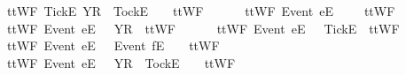 \begin{isabellebody}
\ \ {\isachardoublequoteopen}ttWF{}\ {\isacharbrackleft}{\isacharbrackleft}Tick{\isacharbrackright}\isactrlsub E{\isacharbrackright}\ {\isacharparenleft}{\isacharbrackleft}Y{\isacharbrackright}\isactrlsub R\ {\isacharhash}\ {\isacharbrackleft}Tock{\isacharbrackright}\isactrlsub E\ {\isacharhash}\ {\isasymsigma}{\isacharparenright}\ {\isacharequal}\ ttWF{}\ {\isacharbrackleft}{\isacharbrackright}\ {\isasymsigma}{\isachardoublequoteclose}\ {\isacharbar}\ \isanewline
\ \ {\isachardoublequoteopen}ttWF{}\ {\isacharparenleft}{\isacharbrackleft}Event\ e{\isacharbrackright}\isactrlsub E\ {\isacharhash}\ {\isasymsigma}{\isacharparenright}\ {\isacharbrackleft}{\isacharbrackright}\ {\isacharequal}\ ttWF{}\ {\isasymsigma}\ {\isacharbrackleft}{\isacharbrackright}{\isachardoublequoteclose}\ {\isacharbar}\ \isanewline
\ \ {\isachardoublequoteopen}ttWF{}\ {\isacharparenleft}{\isacharbrackleft}Event\ e{\isacharbrackright}\isactrlsub E\ {\isacharhash}\ {\isasymsigma}{\isacharparenright}\ {\isacharbrackleft}{\isacharbrackleft}Y{\isacharbrackright}\isactrlsub R{\isacharbrackright}\ {\isacharequal}\ ttWF{}\ {\isasymsigma}\ {\isacharbrackleft}{\isacharbrackright}{\isachardoublequoteclose}\ {\isacharbar}\ \isanewline
\ \ {\isachardoublequoteopen}ttWF{}\ {\isacharparenleft}{\isacharbrackleft}Event\ e{\isacharbrackright}\isactrlsub E\ {\isacharhash}\ {\isasymsigma}{\isacharparenright}\ {\isacharbrackleft}{\isacharbrackleft}Tick{\isacharbrackright}\isactrlsub E{\isacharbrackright}\ {\isacharequal}\ ttWF{}\ {\isasymsigma}\ {\isacharbrackleft}{\isacharbrackright}{\isachardoublequoteclose}\ {\isacharbar}\ \isanewline
\ \ {\isachardoublequoteopen}ttWF{}\ {\isacharparenleft}{\isacharbrackleft}Event\ e{\isacharbrackright}\isactrlsub E\ {\isacharhash}\ {\isasymrho}{\isacharparenright}\ {\isacharparenleft}{\isacharbrackleft}Event\ f{\isacharbrackright}\isactrlsub E\ {\isacharhash}\ {\isasymsigma}{\isacharparenright}\ {\isacharequal}\ ttWF{}\ {\isasymrho}\ {\isasymsigma}{\isachardoublequoteclose}\ {\isacharbar}\ \isanewline
\ \ {\isachardoublequoteopen}ttWF{}\ {\isacharparenleft}{\isacharbrackleft}Event\ e{\isacharbrackright}\isactrlsub E\ {\isacharhash}\ {\isasymrho}{\isacharparenright}\ {\isacharparenleft}{\isacharbrackleft}Y{\isacharbrackright}\isactrlsub R\ {\isacharhash}\ {\isacharbrackleft}Tock{\isacharbrackright}\isactrlsub E\ {\isacharhash}\ {\isasymsigma}{\isacharparenright}\ {\isacharequal}\ ttWF{}\ {\isasymrho}\ {\isasymsigma}{\isachardoublequoteclose}\ {\isacharbar}\ \isanewline

\end{isabellebody}

